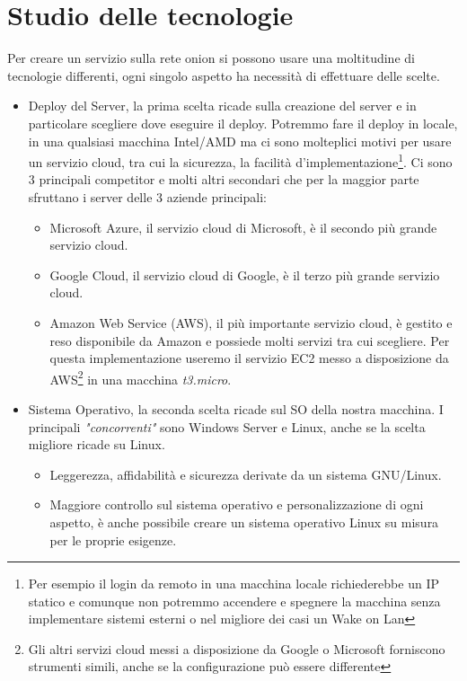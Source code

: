 \newpage
\section{Studio delle tecnologie}
Per creare un servizio sulla rete onion si possono usare una moltitudine di tecnologie differenti, ogni singolo aspetto ha necessità di effettuare delle scelte. \\
\begin{itemize}
    \item Deploy del Server, la prima scelta ricade sulla creazione del server e in particolare scegliere dove eseguire il deploy. Potremmo fare il deploy in locale, in una qualsiasi macchina Intel/AMD ma ci sono molteplici motivi per usare un servizio cloud, tra cui la sicurezza, la facilità d'implementazione\footnote{Per esempio il login da remoto in una macchina locale richiederebbe un IP statico e comunque non potremmo accendere e spegnere la macchina senza implementare sistemi esterni o nel migliore dei casi un Wake on Lan}. Ci sono 3 principali competitor e molti altri secondari che per la maggior parte sfruttano i server delle 3 aziende principali: 
    \begin{itemize}
        \item Microsoft Azure, il servizio cloud di Microsoft, è il secondo più grande servizio cloud.
        \item Google Cloud, il servizio cloud di Google, è il terzo più grande servizio cloud.
        \item Amazon Web Service (AWS), il più importante servizio cloud, è gestito e reso disponibile da Amazon e possiede molti servizi tra cui scegliere. Per questa implementazione useremo il servizio EC2 messo a disposizione da AWS\footnote{Gli altri servizi cloud messi a disposizione da Google o Microsoft forniscono strumenti simili, anche se la configurazione può essere differente} in una macchina \emph{t3.micro}.
    \end{itemize}
    \item Sistema Operativo, la seconda scelta ricade sul SO della nostra macchina. I principali \emph{"concorrenti"} sono Windows Server e Linux, anche se la scelta migliore ricade su Linux.
    \begin{itemize}
        \item Leggerezza, affidabilità e sicurezza derivate da un sistema GNU/Linux.
        \item Maggiore controllo sul sistema operativo e personalizzazione di ogni aspetto, è anche possibile creare un sistema operativo Linux su misura per le proprie esigenze.

\end{itemize}
\end{itemize}
